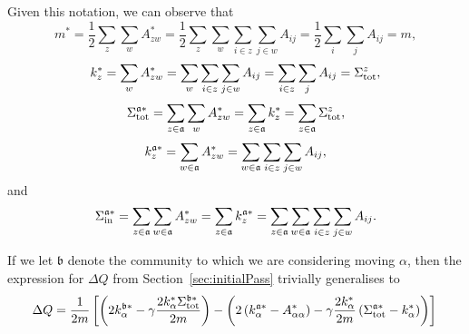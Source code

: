 \documentclass{article}
\begin{document}
Given this notation, we can observe that
\begin{equation}
m^* = \frac{1}{2}\sum_{z}\sum_{w}{A_{zw}^*} = \frac{1}{2}\sum_{z}\sum_{w}{\sum_{i \in z}\sum_{j \in w}A_{ij}} = \frac{1}{2}\sum_i\sum_jA_{ij} = m,
\end{equation}
\begin{equation}
k_{z}^* = \sum_{w}{A_{zw}^*} =  \sum_{w}{\sum_{i \in z}\sum_{j \in w}A_{ij}} = \sum_{i \in z}\sum_{j}A_{ij} = \Sigma_{\text{tot}}^{z},
\end{equation}
\begin{equation}
	\Sigma_{\text{tot}}^{\mathfrak{a} *} = \sum_{z \in \mathfrak{a}}\sum_{w}A_{zw}^* = \sum_{z \in \mathfrak{a}}k_z^* = \sum_{z \in \mathfrak{a}}\Sigma_{\text{tot}}^{z},
\end{equation}
\begin{equation}
	k_{z}^{\mathfrak{a} *} = \sum_{w \in \mathfrak{a}}{A_{zw}^*} = \sum_{w \in \mathfrak{a}}{\sum_{i \in z}\sum_{j \in w}A_{ij}},
\end{equation}
and
\begin{equation}
\Sigma_{\text{in}}^{\mathfrak{a} *} = \sum_{z \in \mathfrak{a}}\sum_{w \in \mathfrak{a}}A_{zw}^* = \sum_{z \in \mathfrak{a}}k_{z}^{\mathfrak{a} *} = \sum_{z \in \mathfrak{a}}\sum_{w \in \mathfrak{a}}{\sum_{i \in z}\sum_{j \in w}A_{ij}}.
\end{equation}

If we let $\mathfrak{b}$ denote the community to which we are considering moving $\alpha$,
then the expression for $\Delta Q$ from Section~\ref{sec:initialPass} trivially generalises to
\begin{equation}
\Delta Q = \frac{1}{2m}\left[ \left( 2 k_{\alpha}^{\mathfrak{b} *} - \gamma \frac{2k_{\alpha}^*\Sigma_{\text{tot}}^{\mathfrak{b} *}}{2m} \right) 
		- \left( 2\left( k_{\alpha}^{\mathfrak{a} *} - A_{\alpha \alpha}^* \right) - \gamma \frac{2k_{\alpha}^*}{2m} \left( \Sigma_{\text{tot}}^{\mathfrak{a} *} - k_{\alpha}^* \right ) \right) \right] \\
\end{equation}
\end{document}
